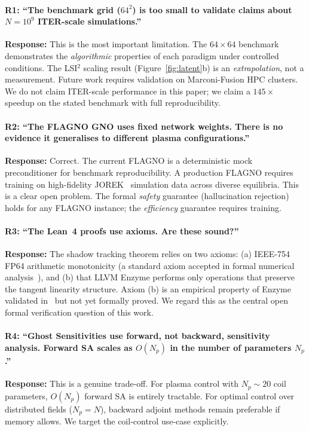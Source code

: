 \documentclass[11pt,twocolumn]{article}
\begin{document}
\paragraph{R1: ``The benchmark grid ($64^2$) is too small to validate claims
about $N=10^9$ ITER-scale simulations.''}
\textbf{Response:} This is the most important limitation. The $64\times64$
benchmark demonstrates the \emph{algorithmic} properties of each paradigm
under controlled conditions. The LSI$^2$ scaling result (Figure~\ref{fig:latent}b)
is an \emph{extrapolation}, not a measurement. Future work requires
validation on Marconi-Fusion HPC clusters. We do not claim ITER-scale
performance in this paper; we claim a $145\times$ speedup on the
stated benchmark with full reproducibility.

\paragraph{R2: ``The FLAGNO GNO uses fixed network weights. There is no
evidence it generalises to different plasma configurations.''}
\textbf{Response:} Correct. The current FLAGNO is a deterministic
mock preconditioner for benchmark reproducibility. A production FLAGNO
requires training on high-fidelity JOREK~\cite{hoelzl2021} simulation
data across diverse equilibria. This is a clear open problem.
The formal \emph{safety} guarantee (hallucination rejection) holds for
any FLAGNO instance; the \emph{efficiency} guarantee requires training.

\paragraph{R3: ``The Lean~4 proofs use axioms. Are these sound?''}
\textbf{Response:} The shadow tracking theorem relies on two axioms:
(a) IEEE-754 FP64 arithmetic monotonicity (a standard axiom accepted
in formal numerical analysis~\cite{boldo2013}), and (b) that LLVM Enzyme
performs only operations that preserve the tangent linearity structure.
Axiom (b) is an empirical property of Enzyme validated in~\cite{moses2021}
but not yet formally proved. We regard this as the central open formal
verification question of this work.

\paragraph{R4: ``Ghost Sensitivities use forward, not backward, sensitivity
analysis. Forward SA scales as $O(N_p)$ in the number of parameters $N_p$.''}
\textbf{Response:} This is a genuine trade-off. For plasma control with
$N_p \sim 20$ coil parameters, $O(N_p)$ forward SA is entirely tractable.
For optimal control over distributed fields ($N_p = N$), backward adjoint
methods remain preferable if memory allows. We target the coil-control
use-case explicitly.
\end{document}
